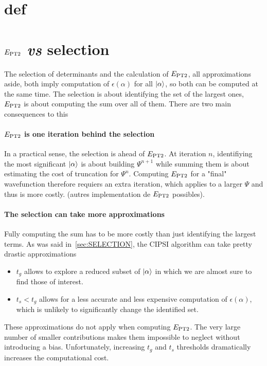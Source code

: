 \documentclass[./thesis.tex]{subfiles}
\begin{document}
\section{def}

\section{$E_\text{PT2}$ \textit{vs} selection}

The selection of determinants and the calculation of $E_\text{PT2}$, all approximations aside, both imply computation of $\epsilon(\alpha)$ for all $\ket \alpha$, so both can be computed at the same time. The selection is about identifying the set of the largest ones, $E_\text{PT2}$ is about computing the sum over all of them. There are two main consequences to this
\paragraph{$E_\text{PT2}$ is one iteration behind the selection}
In a practical sense, the selection is ahead of $E_\text{PT2}$. At iteration $n$, identifiying the most significant $\ket \alpha$ is about building $\Psi^{n+1}$ while summing them is about estimating the cost of truncation for $\Psi^{n}$. Computing $E_\text{PT2}$ for a "final" wavefunction therefore requiers an extra iteration, which applies to a larger $\Psi$ and thus is more costly. \alert{(autres implementation de $E_\text{PT2}$ possibles)}.

\paragraph{The selection can take more approximations}
Fully computing the sum has to be more costly than just identifying the largest terms. As was said in~\ref{sec:SELECTION}, the CIPSI algorithm can take pretty drastic approximations%
	\begin{itemize}
		\item{$t_g$}
		allows to explore a reduced subset of $\ket \alpha$ in which we are almost sure to find those of interest.
		\item{$t_s < t_g$}
		allows for a less accurate and less expensive computation of $\epsilon(\alpha)$, which is unlikely to significantly change the identified set.
	\end{itemize}
	These approximations do not apply when computing $E_\text{PT2}$. The very large number of smaller contributions makes them impossible to neglect without introducing a bias. Unfortunately, increasing $t_g$ and $t_s$ thresholds dramatically increases the computational cost.
\end{document}

